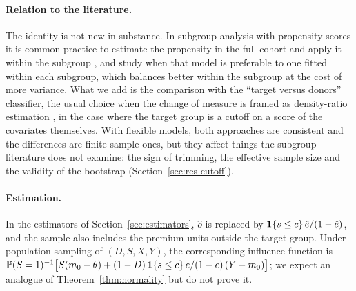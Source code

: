 \paragraph{Relation to the literature.} The identity is not new in substance. In subgroup analysis with propensity scores it is common practice to estimate the propensity in the full cohort and apply it within the subgroup \citep{rassen2012}, and \citet{dong2020} study when that model is preferable to one fitted within each subgroup, which balances better within the subgroup at the cost of more variance. What we add is the comparison with the ``target versus donors'' classifier, the usual choice when the change of measure is framed as density-ratio estimation \citep{bickel2009,sugiyama2012}, in the case where the target group is a cutoff on a score of the covariates themselves. With flexible models, both approaches are consistent and the differences are finite-sample ones, but they affect things the subgroup literature does not examine: the sign of trimming, the effective sample size and the validity of the bootstrap (Section~\ref{sec:res-cutoff}).

\paragraph{Estimation.} In the estimators of Section~\ref{sec:estimators}, $\hat o$ is replaced by $\mathbf{1}\{s\le c\}\,\hat e/(1-\hat e)$, and the sample also includes the premium units outside the target group. Under population sampling of $(D,S,X,Y)$, the corresponding influence function is $\mathbb{P}(S=1)^{-1}\bigl[S(m_0-\theta)+(1-D)\,\mathbf{1}\{s\le c\}\,e/(1-e)\,(Y-m_0)\bigr]$; we expect an analogue of Theorem~\ref{thm:normality} but do not prove it.

